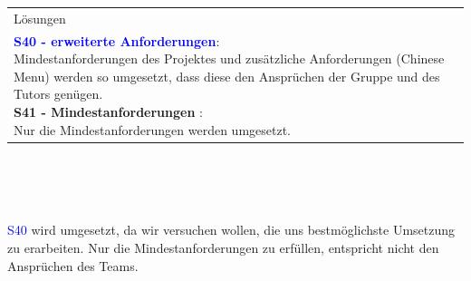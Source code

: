 \documentclass[enabledeprecatedfontcommands,fontsize=11pt,paper=a4,twoside]{scrartcl}
\newcounter{one}
\newcommand{\cb}[1]{{\textcolor{blue}{#1}}}
\begin{document}
\begin{tabular} {|p{8cm} p{8cm}|}
	\multicolumn{2}{|l|}{Lösungen} \\
	\multicolumn{2}{|l|}{\parbox{16cm}{
			\textbf{\cb{\hypertarget{nnn}{S40 - erweiterte Anforderungen}}}: \\
			Mindestanforderungen des Projektes und zusätzliche Anforderungen (Chinese Menu) werden so umgesetzt, dass diese den Ansprüchen der Gruppe und des Tutors genügen. \\
			\textbf{S41 - Mindestanforderungen }: \\
			Nur die Mindestanforderungen werden umgesetzt. \\
	} }\\ [6ex] \hline
\end{tabular}\\ \\ \\
\begin{onehalfspace}
	\cb{S40} wird umgesetzt, da wir versuchen wollen, die uns bestmöglichste Umsetzung zu erarbeiten. Nur die Mindestanforderungen zu erfüllen, entspricht nicht den Ansprüchen des Teams.
\end{onehalfspace}
\end{document}
